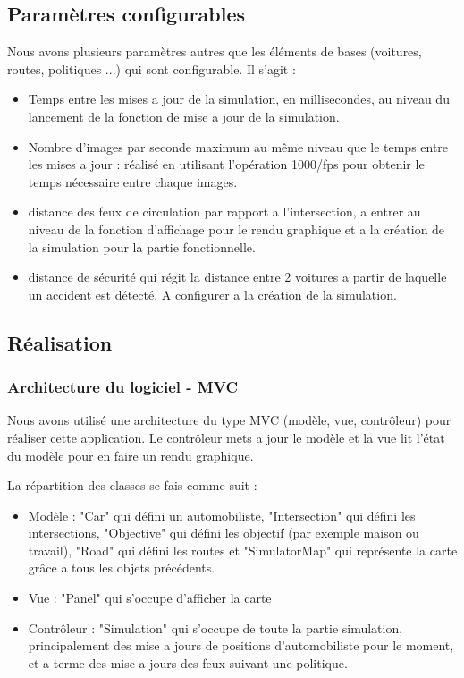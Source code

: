 \documentclass[12pt]{article}
\begin{document}
        \subsection{Paramètres configurables}
        	Nous avons plusieurs paramètres autres que les éléments de bases (voitures, routes, politiques ...) qui sont configurable. Il s'agit :
        		\begin{itemize}
        			\item Temps entre les mises a jour de la simulation, en millisecondes, au niveau du lancement de la fonction de mise a jour de la simulation.
        			\item Nombre d'images par seconde maximum au même niveau que le temps entre les mises a jour : réalisé en utilisant l'opération  1000/fps pour obtenir le temps nécessaire entre chaque images.
        			\item distance des feux de circulation par rapport a l'intersection, a entrer au niveau de la fonction d'affichage pour le rendu graphique et a la création de la simulation pour la partie fonctionnelle.
        			\item distance de sécurité qui régit  la distance entre 2 voitures a partir de laquelle un accident est détecté. A configurer a la création de la simulation.
				\end{itemize}
		\subsection{Réalisation}
			\subsubsection{Architecture du logiciel - MVC}
				Nous avons utilisé une architecture du type MVC (modèle, vue, contrôleur) pour réaliser cette application. Le contrôleur mets a jour le modèle et la vue lit l'état du modèle pour en faire un rendu graphique.
				
				La répartition des classes se fais comme suit :
				\begin{itemize}
					\item Modèle : "Car" qui défini un automobiliste, "Intersection" qui défini les intersections, "Objective" qui défini les objectif (par exemple maison ou travail), "Road" qui défini les routes et "SimulatorMap" qui représente la carte grâce a tous les objets précédents.
					\item Vue : "Panel" qui s'occupe d'afficher la carte
					\item Contrôleur : "Simulation" qui s'occupe de toute la partie simulation, principalement des mise a jours de positions d'automobiliste pour le moment, et a terme des mise a jours des feux suivant une politique. 
				\end{itemize}
				
\end{document}
